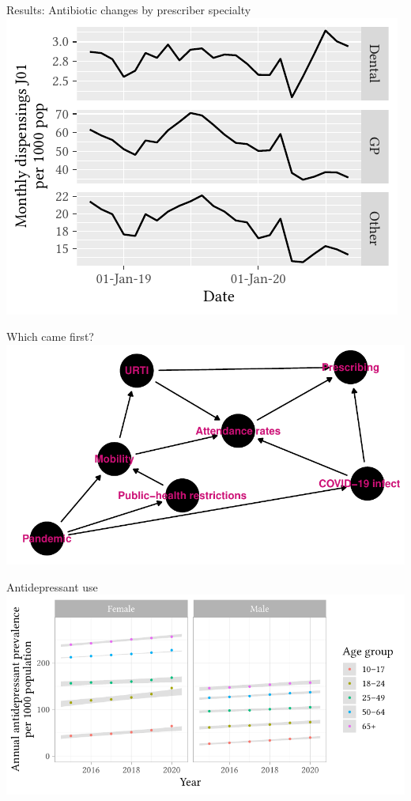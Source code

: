 \documentclass[aspectratio=169,12pt]{beamer} %
\begin{document}
\begin{frame}{Results: Antibiotic changes by prescriber specialty}
\centering
\includegraphics{ref/latex-j01specialty-1.pdf}
\end{frame}

\begin{frame}{Which came first?}
\centering
\includegraphics[height=0.8\textheight]
        {ref/dag.pdf}
\end{frame}

\begin{frame}{Antidepressant use}
\centering
\includegraphics[height=0.8\textheight]
        {ref/covid19mh-prev-age.pdf}
	\nocite{costa_2023}
\end{frame}
\end{document}
